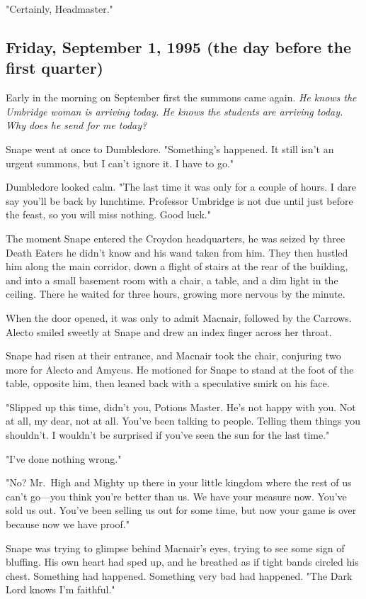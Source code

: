 "Certainly, Headmaster."

\subsection{Friday, September 1, 1995 (the day before the first quarter)}

Early in the morning on September first the summons came again. \emph{He knows the Umbridge woman is arriving today. He knows the students are arriving today. Why does he send for me today?}

Snape went at once to Dumbledore. "Something's happened. It still isn't an urgent summons, but I can't ignore it. I have to go."

Dumbledore looked calm. "The last time it was only for a couple of hours. I dare say you'll be back by lunchtime. Professor Umbridge is not due until just before the feast, so you will miss nothing. Good luck."

The moment Snape entered the Croydon headquarters, he was seized by three Death Eaters he didn't know and his wand taken from him. They then hustled him along the main corridor, down a flight of stairs at the rear of the building, and into a small basement room with a chair, a table, and a dim light in the ceiling. There he waited for three hours, growing more nervous by the minute.

When the door opened, it was only to admit Macnair, followed by the Carrows. Alecto smiled sweetly at Snape and drew an index finger across her throat.

Snape had risen at their entrance, and Macnair took the chair, conjuring two more for Alecto and Amycus. He motioned for Snape to stand at the foot of the table, opposite him, then leaned back with a speculative smirk on his face.

"Slipped up this time, didn't you, Potions Master. He's not happy with you. Not at all, my dear, not at all. You've been talking to people. Telling them things you shouldn't. I wouldn't be surprised if you've seen the sun for the last time."

"I've done nothing wrong."

"No? Mr.~High and Mighty up there in your little kingdom where the rest of us can't go—you think you're better than us. We have your measure now. You've sold us out. You've been selling us out for some time, but now your game is over because now we have proof."

Snape was trying to glimpse behind Macnair's eyes, trying to see some sign of bluffing. His own heart had sped up, and he breathed as if tight bands circled his chest. Something had happened. Something very bad had happened. "The Dark Lord knows I'm faithful."

